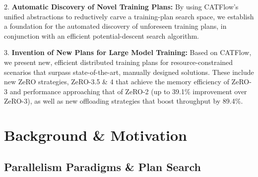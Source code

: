 \documentclass[letterpaper,twocolumn,10pt]{article}
\newcommand{\name}{CATFlow}
\begin{document}
2. \textbf{Automatic Discovery of Novel Training Plans:} By using \name{}'s unified abstractions to reductively carve a training-plan search space, we establish a foundation for the automated discovery of unforeseen training plans, in conjunction with an efficient potential-descent search algorithm.

3. \textbf{Invention of New Plans for Large Model Training:} Based on \name{}, we present new, efficient distributed training plans for resource-constrained scenarios that surpass state-of-the-art, manually designed solutions. These include new ZeRO strategies, ZeRO-3.5 \& 4 that achieve the memory efficiency of ZeRO-3 and performance approaching that of ZeRO-2 (up to 39.1\% improvement over ZeRO-3), as well as new offloading strategies that boost throughput by 89.4\%.

\section{Background \& Motivation}

\subsection{Parallelism Paradigms \& Plan Search}

\end{document}
